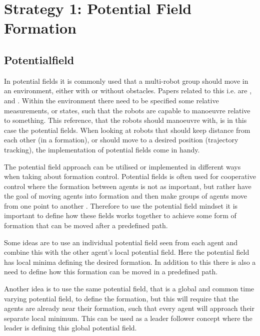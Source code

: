 \section{Strategy 1: Potential Field Formation}
\label{sc:potential-fields}


\subsection{Potentialfield}
In potential fields it is commonly used that a multi-robot group should move in an environment, either with or without obstacles. Papers related to this i.e. are \citep{pfmrm}, \citep{fccsc} and \citep{UAVff3dpf}. Within the environment there need to be specified some relative measurements, or states, such that the robots are capable to manoeuvre relative to something. This reference, that the robots should manoeuvre with, is in this case the potential fields. When looking at robots that should keep distance from each other (in a formation), or should move to a desired position (trajectory tracking), the implementation of potential fields come in handy.

The potential field approach can be utilised or implemented in
different ways when taking about formation control. Potential fields
is often used for cooperative control where the formation between
agents is not as important, but rather have the goal of moving agents into formation and then make groups of
agents move from one point to another \citep{5504176}. Therefore to
use the potential field mindset it is important to define how these
fields works together to achieve some form of formation that can be
moved after a predefined path. 

Some ideas are to use an individual potential field seen from each
agent and combine this with the other agent's local potential field.
Here the potential field has local minima defining the desired
formation. In addition to this there is also a need to define how this
formation can be moved in a predefined path.

Another idea is to use the same potential field, that is a global and
common time varying potential field, to define the formation, but this
will require that the agents are already near their formation, such
that every agent will approach their separate local minimum. This can
be used as a leader follower concept where the leader is defining this
global potential field.

